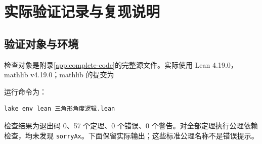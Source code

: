 \documentclass[UTF8,a4paper,zihao=-4,oneside,openany,fontset=fandol]{ctexbook}
\theoremstyle{definition}
\theoremstyle{remark}
\begin{document}
\chapter{实际验证记录与复现说明}
\label{app:verification}

\section{验证对象与环境}

检查对象是附录\ref{app:complete-code}的完整源文件。实际使用 Lean 4.19.0，mathlib v4.19.0；mathlib 的提交为
\begin{quote}\small{}\end{quote}
运行命令为：
\begin{Verbatim}
lake env lean 三角形角度逻辑.lean
\end{Verbatim}
检查结果为退出码 0、57 个定理、0 个错误、0 个警告。对全部定理执行公理依赖检查，均未发现 \texttt{sorryAx}。下面保留实际输出；这些标准公理名称不是错误提示。
\end{document}

